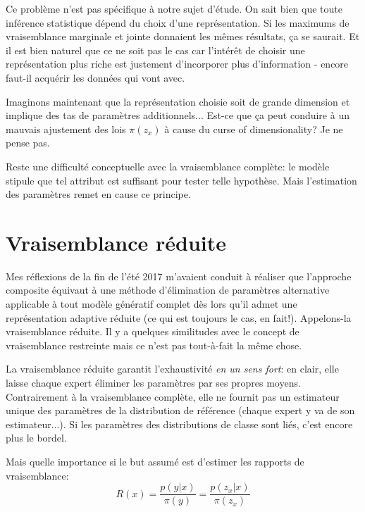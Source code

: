 \documentclass{article}
\begin{document}
Ce probl\`eme n'est pas sp\'ecifique \`a notre sujet d'\'etude. On sait bien que toute inf\'erence statistique d\'epend du choix d'une repr\'esentation. Si les maximums de vraisemblance marginale et jointe donnaient les m\^emes r\'esultats, \c{c}a se saurait. Et il est bien naturel que ce ne soit pas le cas car l'int\'er\^et de choisir une repr\'esentation plus riche est justement d'incorporer plus d'information - encore faut-il acqu\'erir les donn\'ees qui vont avec. 

Imaginons maintenant que la repr\'esentation choisie soit de grande dimension et implique des tas de param\`etres additionnels... Est-ce que \c{c}a peut conduire \`a un mauvais ajustement des lois $\pi(z_x)$ \`a cause du curse of dimensionality? Je ne pense pas. 

Reste une difficult\'e conceptuelle avec la vraisemblance compl\`ete: le mod\`ele stipule que tel attribut est suffisant pour tester telle hypoth\`ese. Mais l'estimation des param\`etres remet en cause ce principe. 


\section{Vraisemblance r\'eduite}

Mes r\'eflexions de la fin de l'\'et\'e 2017 m'avaient conduit \`a r\'ealiser que l'approche composite \'equivaut \`a une m\'ethode d'\'elimination de param\`etres alternative applicable \`a tout mod\`ele g\'en\'eratif complet d\`es lors qu'il admet une repr\'esentation adaptive r\'eduite (ce qui est toujours le cas, en fait!). Appelons-la vraisemblance r\'eduite. Il y a quelques similitudes avec le concept de vraisemblance restreinte mais ce n'est pas tout-\`a-fait la m\^eme chose. 

La vraisemblance r\'eduite garantit l'exhaustivit\'e {\em en un sens fort}: en clair, elle laisse chaque expert \'eliminer les param\`etres par ses propres moyens. Contrairement \`a la vraisemblance compl\`ete, elle ne fournit pas un estimateur unique des param\`etres de la distribution de r\'ef\'erence (chaque expert y va de son estimateur...). Si les param\`etres des distributions de classe sont li\'es, c'est encore plus le bordel. 

Mais quelle importance si le but assum\'e est d'estimer les rapports de vraisemblance: 
$$
R(x) 
= \frac{p(y|x)}{\pi(y)}
= \frac{p(z_x|x)}{\pi(z_x)}
$$ 
\end{document}

